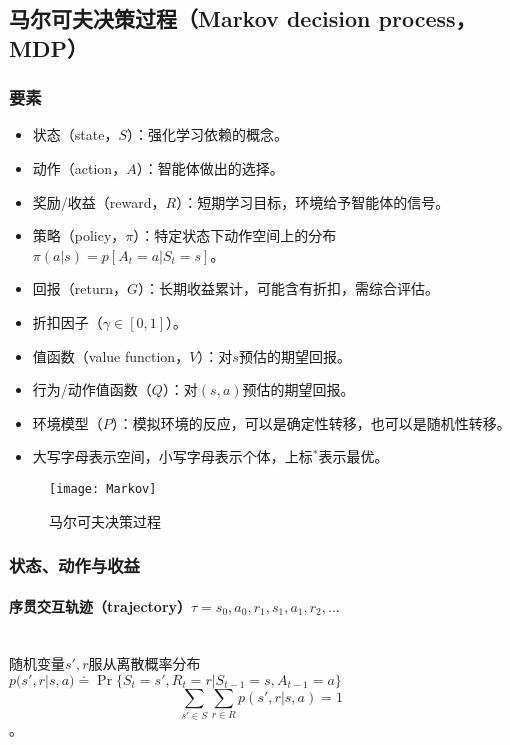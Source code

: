 \documentclass[
12pt, %
a4paper, 
oneside, %
headinclude,footinclude, %
]{scrartcl}
\begin{document}
\subsection[马尔可夫决策过程]{马尔可夫决策过程（Markov decision process，MDP）}
\subsubsection[要素]{要素}
\begin{itemize}
\item 状态（state，$ S $）：强化学习依赖的概念。
\item 动作（action，$ A $）：智能体做出的选择。
\item 奖励/收益（reward，$ R $）：短期学习目标，环境给予智能体的信号。
\item 策略（policy，$ \pi $）：特定状态下动作空间上的分布$ \pi(a|s) = p[A_t = a|S_t = s] $。
\item 回报（return，$ G $）：长期收益累计，可能含有折扣，需综合评估。
\item 折扣因子（$ \gamma \in [0, 1] $）。
\item 值函数（value function，$ V $）：对$ s $预估的期望回报。
\item 行为/动作值函数（$ Q $）：对$ (s, a) $预估的期望回报。
\item 环境模型（$ P $）：模拟环境的反应，可以是确定性转移，也可以是随机性转移。
\item 大写字母表示空间，小写字母表示个体，上标$ ^* $表示最优。
\end{itemize}

\begin{figure}[H]
\centering 
\texttt{[image: Markov]} 
\caption{马尔可夫决策过程}
\end{figure}
\subsubsection[状态、动作与收益]{状态、动作与收益}
\paragraph{序贯交互轨迹（trajectory）$ \tau =  s_0, a_0, r_1, s_1, a_1, r_2, \dots $}~\\

随机变量$ s',r $服从离散概率分布$ p(s', r|s, a) \doteq \Pr\{S_t = s', R_t = r|S_{t - 1} = s, A_{t - 1} = a\} $
$$ \sum_{s' \in S}\sum_{r \in R} p(s', r|s, a) = 1 $$。
\end{document}
